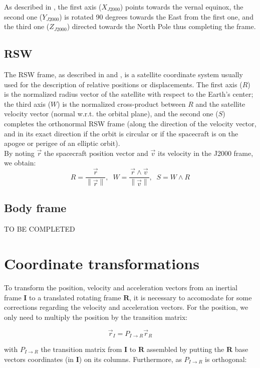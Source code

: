 \documentclass{article}
\newcommand{\norm}[1]{\left\lVert#1\right\rVert}
\begin{document}
As described in \cite{book:911134}, the first axis ($X_{J2000}$) points towards the vernal equinox, the second one ($Y_{J2000}$) is rotated 90 degrees towards the East from the first one, and the third one ($Z_{J2000}$) directed towards the North Pole thus completing the frame.

\subsection{RSW}

The RSW frame, as described in \cite{vallado2004covariance} and \cite{book:911134}, is a satellite coordinate system usually used for the description of relative positions or displacements. The first axis ($R$) is the normalized radius vector of the satellite with respect to the Earth's center; the third axis ($W$) is the normalized cross-product between $R$ and the satellite velocity vector (normal w.r.t. the orbital plane), and the second one ($S$) completes the orthonormal RSW frame (along the direction of the velocity vector, and in its exact direction if the orbit is circular or if the spacecraft is on the apogee or perigee of an elliptic orbit). \\
By noting $\vec{r}$ the spacecraft position vector and $\vec{v}$ its velocity in the J2000 frame, we obtain:
\[ R = \frac{\vec{r}}{\norm{\vec{r}}}, \;\; W = \frac{\vec{r}\wedge \vec{v}}{\norm{\vec{v}}}, \; \; S = W \wedge R \]

\subsection{Body frame}

TO BE COMPLETED

\section{Coordinate transformations}

To transform the position, velocity and acceleration vectors from an inertial frame $\bm{I}$ to a translated rotating frame $\bm{R}$, it is necessary to accomodate for some corrections regarding the velocity and acceleration vectors. For the position, we only need to multiply the position by the transition matrix:

\begin{equation}
\vec{r}_I = P_{I \rightarrow R}\vec{r}_R
\end{equation}

with $P_{I \rightarrow R}$ the transition matrix from $\bm{I}$ to $\bm{R}$ assembled by putting the $\bm{R}$ base vectors coordinates (in $\bm{I}$) on its columns. Furthermore, as $P_{I \rightarrow R}$ is orthogonal:
\end{document}
